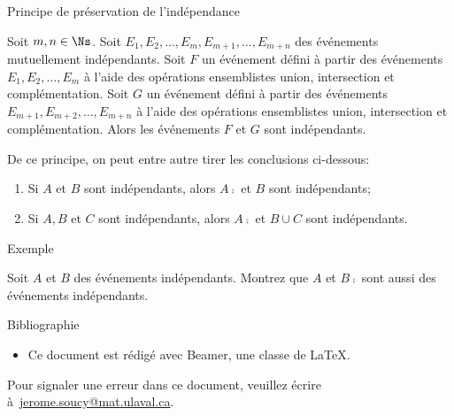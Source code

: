 \documentclass[nuit,charter,pied]{BeamerJS}
\begin{document}
\begin{frame}{Principe de préservation de l'indépendance}
\pause
	\begin{thm}{}{}
		Soit \(m,n\in\Ns\). Soit \(E_1,E_2,\ldots,E_m,E_{m+1},\ldots,E_{m+n}\) des événements mutuellement indépendants. Soit \(F\) un événement défini à partir des événements $E_1,E_2,\ldots,E_m$ à l'aide des opérations ensemblistes union, intersection et complémentation. Soit \(G\) un événement défini à partir des événements $E_{m+1},E_{m+2},\ldots,E_{m+n}$ à l'aide des opérations ensemblistes union, intersection et complémentation. Alors les événements \(F\) et \(G\) sont indépendants.
	\end{thm}
	\pause
	De ce principe, on peut entre autre tirer les conclusions ci-dessous:
	\begin{enumerate}
		\item Si $A$ et $B$ sont indépendants, alors $A\comp$ et $B$ sont indépendants;\pause
		\item Si $A,B$ et $C$ sont indépendants, alors $A\comp$ et $B\cup C$ sont indépendants.
	\end{enumerate}
\end{frame}
\begin{frame}{Exemple}
\begin{ex}
	Soit $A$ et $B$ des événements indépendants. Montrez que $A$ et $B\comp$ sont aussi des événements indépendants.
\end{ex}
\end{frame}

 \begin{frame}{Bibliographie}
 \printbibliography[heading=none]
\vfill
 \begin{rems}
 	\begin{itemize}
 		\item Ce document est rédigé avec Beamer, une classe de \LaTeX.
 	\end{itemize}
 \end{rems}
 	\vfill
 	\footnotesize Pour signaler une erreur dans ce document, veuillez écrire à~\href{mailto:jerome.soucy@mat.ulaval.ca}{jerome.soucy@mat.ulaval.ca}.
 \end{frame}
\end{document}
